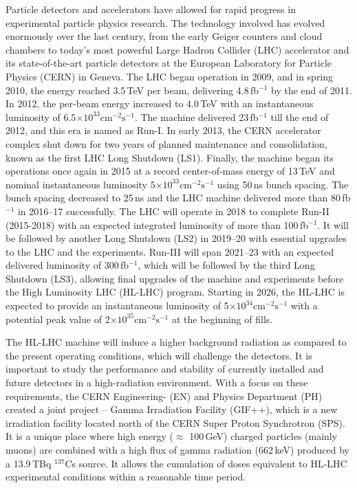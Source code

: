 Particle detectors and accelerators have allowed for rapid progress in experimental particle physics research. The technology involved has evolved enormously over the last century, from the early Geiger counters and cloud chambers to today's most powerful Large Hadron Collider (LHC) accelerator and its state-of-the-art particle detectors at the European Laboratory for Particle Physics (CERN) in Geneva. The LHC began operation in 2009, and in spring 2010, the energy reached 3.5\,TeV per beam, delivering 4.8\,fb$^{-1}$ by the end of 2011. In 2012, the per-beam energy increased to 4.0\,TeV with an instantaneous luminosity of 6.5$\times 10^{33}\text{cm}^{-2}\text{s}^{-1}$. The machine delivered 23\,fb$^{-1}$ till the end of 2012, and this era is named as Run-I. In early 2013, the CERN accelerator complex shut down for two years of planned maintenance and consolidation, known as the first LHC Long Shutdown (LS1). Finally, the machine began its operations once again in 2015 at a record center-of-mass energy of 13\,TeV and nominal instantaneous luminosity 5$\times 10^{33}\text{cm}^{-2}\text{s}^{-1}$ using 50\,ns bunch spacing. The bunch spacing decreased to 25\,ns and the LHC machine delivered more than 80\,fb$^{-1}$ in 2016–17 successfully. The LHC will operate in 2018 to complete Run-II (2015-2018) with an expected integrated luminosity of more than 100\,fb$^{-1}$. It will be followed by another Long Shutdown (LS2) in 2019–20 with essential upgrades to the LHC and the experiments. Run-III will span 2021–23 with an expected delivered luminosity of 300\,fb$^{-1}$, which will be followed by the third Long Shutdown (LS3), allowing final upgrades of the machine and experiments before the High Luminosity LHC (HL-LHC) program. Starting in 2026, the HL-LHC is expected to provide an instantaneous luminosity of 5$\times 10^{34}\text{cm}^{-2}\text{s}^{-1}$ with a potential peak value  of 2$\times 10^{35}\text{cm}^{-2}\text{s}^{-1}$ at the beginning of fills. 

The HL-LHC machine will induce a higher background radiation as compared to the present operating conditions, which will challenge the detectors. It is important to study the performance and stability of currently installed and future detectors in a high-radiation environment. With a focus on these requirements, the CERN Engineering- (EN) and Physics Department (PH) created a joint project – Gamma Irradiation Facility (GIF++), which is a new irradiation facility located north of the CERN Super Proton Synchrotron (SPS). It is a unique place where high energy ($\approx$ 100\,GeV) charged particles (mainly muons) are combined with a high flux of gamma radiation (662\,keV) produced by a 13.9\,TBq $^{137}$Cs source. It allows the cumulation of doses equivalent to HL-LHC experimental conditions within a reasonable time period.

